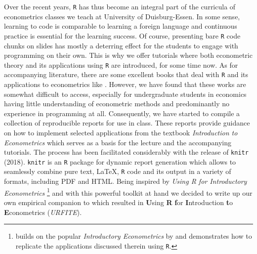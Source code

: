 \documentclass[]{book}
\let\rmarkdownfootnote\footnote%
\def\footnote{\protect\rmarkdownfootnote}
\theoremstyle{definition}
\theoremstyle{definition}
\theoremstyle{definition}
\theoremstyle{remark}
\begin{document}
Over the recent years, \texttt{R} has thus become an integral part of
the curricula of econometrics classes we teach at University of
Duisburg-Essen. In some sense, learning to code is comparable to
learning a foreign language and continuous practice is essential for the
learning success. Of course, presenting bare \texttt{R} code chunks on
slides has mostly a deterring effect for the students to engage with
programming on their own. This is why we offer tutorials where both
econometric theory and its applications using \texttt{R} are introduced,
for some time now. As for accompanying literature, there are some
excellent books that deal with \texttt{R} and its applications to
econometrics like \citet{kleiber2008}. However, we have found that these
works are somewhat difficult to access, especially for undergraduate
students in economics having little understanding of econometric methods
and predominantly no experience in programming at all. Consequently, we
have started to compile a collection of reproducible reports for use in
class. These reports provide guidance on how to implement selected
applications from the textbook \emph{Introduction to Econometrics}
\citep{stock2015} which serves as a basis for the lecture and the
accompanying tutorials. The process has been facilitated considerably
with the release of \texttt{knitr} (2018). \texttt{knitr} is an
\texttt{R} package for dynamic report generation which allows to
seamlessly combine pure text, LaTeX, \texttt{R} code and its output in a
variety of formats, including PDF and HTML. Being inspired by
\emph{Using R for Introductory Econometrics} \citep{heiss2016}\footnote{\citet{heiss2016}
  builds on the popular \emph{Introductory Econometrics} by
  \citet{wooldridge2016} and demonstrates how to replicate the
  applications discussed therein using \texttt{R}.} and with this
powerful toolkit at hand we decided to write up our own empirical
companion to \citet{stock2015} which resulted in \textbf{U}sing
\textbf{R} \textbf{f}or \textbf{I}ntroduction \textbf{t}o
\textbf{E}conometrics (\emph{URFITE}).
\end{document}

